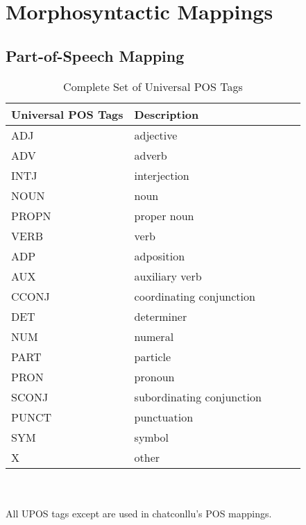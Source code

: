  
\chapter{Morphosyntactic Mappings}
\label{appendixa}

\section{Part-of-Speech Mapping}

\begin{table}[h!]
\caption {Complete Set of Universal POS Tags} \label{tab:uposset}
\begin{tabular}{@{}lllll@{}}
\toprule
\textbf{Universal POS Tags} & \textbf{Description}\\ \midrule
ADJ & adjective\\
ADV & adverb\\
INTJ & interjection\\
NOUN & noun\\
PROPN & proper noun\\
VERB & verb\\\midrule
ADP & adposition\\
AUX & auxiliary verb\\
CCONJ & coordinating conjunction\\
DET & determiner\\
NUM & numeral\\
PART & particle\\
PRON & pronoun\\
SCONJ & subordinating conjunction\\\midrule
PUNCT & punctuation\\
SYM & symbol\\
X & other\\\bottomrule
\end{tabular}\\
\vspace{0.5cm}\\
All UPOS tags except  are used in chatconllu's POS mappings.\\
\end{table}

